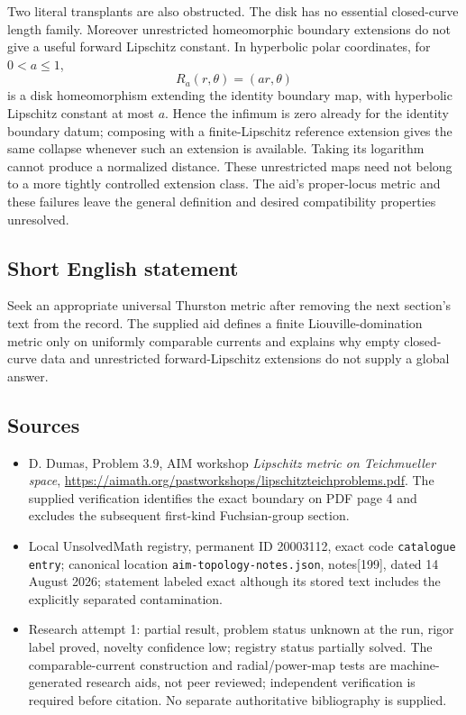 \documentclass[11pt]{article}
\begin{document}
Two literal transplants are also obstructed. The disk has no essential closed-curve length family. Moreover unrestricted homeomorphic boundary extensions do not give a useful forward Lipschitz constant. In hyperbolic polar coordinates, for \(0<a\le1\),
\[
R_a(r,\theta)=(ar,\theta)
\]
is a disk homeomorphism extending the identity boundary map, with hyperbolic Lipschitz constant at most \(a\). Hence the infimum is zero already for the identity boundary datum; composing with a finite-Lipschitz reference extension gives the same collapse whenever such an extension is available. Taking its logarithm cannot produce a normalized distance. These unrestricted maps need not belong to a more tightly controlled extension class. The aid's proper-locus metric and these failures leave the general definition and desired compatibility properties unresolved.
\subsection{Short English statement}
Seek an appropriate universal Thurston metric after removing the next section's text from the record. The supplied aid defines a finite Liouville-domination metric only on uniformly comparable currents and explains why empty closed-curve data and unrestricted forward-Lipschitz extensions do not supply a global answer.
\subsection{Sources}
\begin{itemize}
\item D. Dumas, Problem 3.9, AIM workshop \emph{Lipschitz metric on Teichmueller space}, \url{https://aimath.org/pastworkshops/lipschitzteichproblems.pdf}. The supplied verification identifies the exact boundary on PDF page 4 and excludes the subsequent first-kind Fuchsian-group section.
\item Local UnsolvedMath registry, permanent ID 20003112, exact code \texttt{catalogue entry}; canonical location \texttt{aim-topology-notes.json}, notes[199], dated 14 August 2026; statement labeled exact although its stored text includes the explicitly separated contamination.
\item Research attempt 1: partial result, problem status unknown at the run, rigor label proved, novelty confidence low; registry status partially solved. The comparable-current construction and radial/power-map tests are machine-generated research aids, not peer reviewed; independent verification is required before citation. No separate authoritative bibliography is supplied.
\end{itemize}
\end{document}
